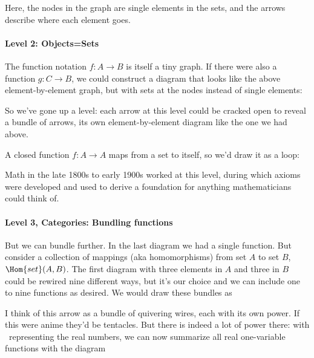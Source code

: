 \documentclass[11pt]{article}
\begin{document}
Here, the nodes in the graph are single elements in the sets, and the arrows describe
where each element goes.

\paragraph{Level 2: Objects=Sets}
The function notation $f:A\to B$ is itself a tiny graph. If there were also a function
$g:C\to B$, we could construct a diagram that looks like the above element-by-element graph, but with sets at the nodes instead of single elements:

So we've gone up a level: each arrow at this level could be cracked open to reveal
a bundle of arrows, its own element-by-element diagram like the one we had above.

A closed function $f:A\to A$ maps from a set to itself, so we'd draw it as a loop:


Math in the late 1800s to early 1900s worked at this level, during which axioms
were developed and used to derive a foundation for anything mathematicians could think of.

\paragraph{Level 3, Categories: Bundling functions}
But we can bundle further. In the last
diagram we had a single function. But consider a collection of mappings (aka homomorphisms)
from set $A$ to set $B$, $\Hom{set}(A, B)$.
The first diagram with three elements in $A$ and
three in $B$ could be rewired nine different ways, but it's our choice and we can include
one to nine functions as desired.  We would draw these
bundles as

I think of this arrow as a bundle of quivering wires, each with its own power. If this were anime
they'd be tentacles. But there is indeed a lot of power there: with \Re\ representing the
real numbers, we can now summarize all real one-variable functions with the diagram 
\end{document}
